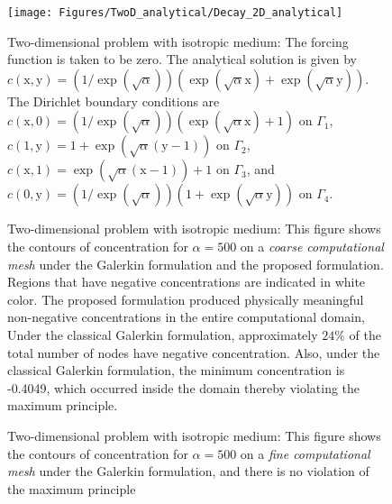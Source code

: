 \documentclass[11pt]{amsart}
\begin{document}
\begin{figure}[h]
  \centering
  \texttt{[image: Figures/TwoD\_analytical/Decay\_2D\_analytical]}
  \caption{Two-dimensional problem with isotropic medium: The forcing function is taken to be 
    zero. The analytical solution is given by $c(\mathrm{x},\mathrm{y})=(1/\exp (\sqrt{\alpha}))
    (\exp (\sqrt{\alpha} \mathrm{x}) + \exp (\sqrt{\alpha} \mathrm{y}))$. The Dirichlet boundary 
    conditions are $c(\mathrm{x},0)=(1/\exp (\sqrt{\alpha}))(\exp (\sqrt{\alpha} \mathrm{x})+1)$ 
    on $\Gamma_{1}$, $c(1,\mathrm{y}) = 1 + \exp (\sqrt{\alpha}(\mathrm{y}-1))$ on $\Gamma_{2}$, 
    $c(\mathrm{x},1) = \exp(\sqrt{\alpha} (\mathrm{x}-1))+1$ on $\Gamma_{3}$, and $c(0,\mathrm{y}) 
    = (1/\exp (\sqrt{\alpha}))(1+\exp (\sqrt{\alpha} \mathrm{y}))$ on $\Gamma_{4}$.} 
  \label{Fig:Helmholtz_2D_analytical}
\end{figure}

\begin{figure}[h]
  \centering
\caption{Two-dimensional problem with isotropic medium: This figure shows the 
    contours of concentration for $\alpha = 500$ on a \emph{coarse computational mesh} 
    under the Galerkin formulation and the proposed formulation. Regions that have 
    negative concentrations are indicated in white color. The proposed formulation 
    produced physically meaningful non-negative concentrations in the entire computational 
    domain, Under the classical Galerkin formulation, approximately $24\%$ of the total 
    number of nodes have negative concentration. Also, under the classical Galerkin 
    formulation, the  minimum concentration is -0.4049, which occurred inside the 
    domain thereby violating the maximum principle.}\label{Fig:Decay_2D_coarse_mesh}
\end{figure}

\begin{figure}[h]
  \centering
\caption{Two-dimensional problem with isotropic medium: This figure shows the 
    contours of concentration for $\alpha = 500$ on a \emph{fine computational mesh} 
    under the Galerkin formulation, and there is no violation of the maximum principle}
  \label{Fig:Decay_2D_fine_mesh}
\end{figure}
\end{document}
